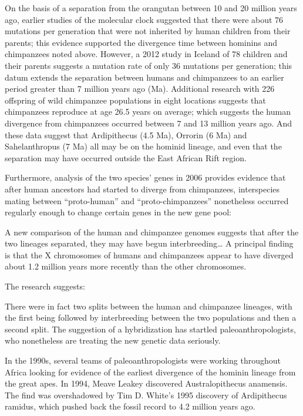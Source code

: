 On the basis of a separation from the orangutan between 10 and 20 million years ago, earlier studies of the molecular clock suggested that there were about 76 mutations per generation that were not inherited by human children from their parents; this evidence supported the divergence time between hominins and chimpanzees noted above. However, a 2012 study in Iceland of 78 children and their parents suggests a mutation rate of only 36 mutations per generation; this datum extends the separation between humans and chimpanzees to an earlier period greater than 7 million years ago (Ma). Additional research with 226 offspring of wild chimpanzee populations in eight locations suggests that chimpanzees reproduce at age 26.5 years on average; which suggests the human divergence from chimpanzees occurred between 7 and 13 million years ago. And these data suggest that Ardipithecus (4.5 Ma), Orrorin (6 Ma) and Sahelanthropus (7 Ma) all may be on the hominid lineage, and even that the separation may have occurred outside the East African Rift region.

Furthermore, analysis of the two species' genes in 2006 provides evidence that after human ancestors had started to diverge from chimpanzees, interspecies mating between ``proto-human'' and ``proto-chimpanzees'' nonetheless occurred regularly enough to change certain genes in the new gene pool:

A new comparison of the human and chimpanzee genomes suggests that after the two lineages separated, they may have begun interbreeding\ldots{} A principal finding is that the X chromosomes of humans and chimpanzees appear to have diverged about 1.2 million years more recently than the other chromosomes.

The research suggests:

There were in fact two splits between the human and chimpanzee lineages, with the first being followed by interbreeding between the two populations and then a second split. The suggestion of a hybridization has startled paleoanthropologists, who nonetheless are treating the new genetic data seriously.

In the 1990s, several teams of paleoanthropologists were working throughout Africa looking for evidence of the earliest divergence of the hominin lineage from the great apes. In 1994, Meave Leakey discovered Australopithecus anamensis. The find was overshadowed by Tim D. White's 1995 discovery of Ardipithecus ramidus, which pushed back the fossil record to 4.2 million years ago.

